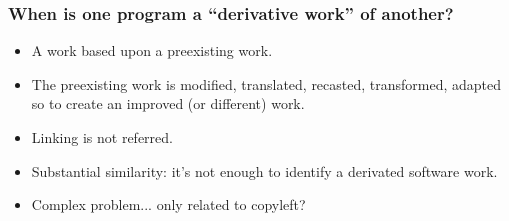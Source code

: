 \documentclass{beamer}
\begin{document}
\begin{frame}
\frametitle{When is one program a ``derivative work'' of another?}

\pause

\begin{itemize}
\item A work based upon a preexisting work.
\item The preexisting work is modified, translated, recasted, 
transformed, adapted so to create an improved (or different) work.
\item \alert{Linking} is not referred. 
\item \alert{Substantial similarity}: it's not enough to identify a derivated software work. 
\item Complex problem... only related to copyleft?
\end{itemize}
\end{frame}




\end{document}
